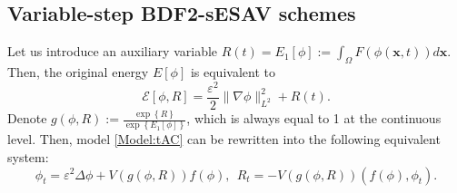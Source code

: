 \documentclass{m2an}
\begin{document}
\subsection{Variable-step BDF2-sESAV schemes}
Let us introduce an auxiliary variable $ R(t) = E_1[\phi] := \int_{\Omega}  F( \phi(\mathbf{x},t) )  d \mathbf{x}$. Then, the original energy $E[\phi]$ is equivalent to
$$
\mathcal{E}[\phi, R] = \frac{\varepsilon^2}{2}\|\nabla \phi\|_{L^2}^2 + R(t).
$$
Denote $g(\phi, R):=\frac{\exp \left\{R\right\}}{ \exp \left\{E_{1}[\phi]\right\} }$, which is always equal to 1 at the continuous level. Then, model \eqref{Model:tAC} can be rewritten into the following equivalent system:
\begin{equation}\label{sav_1}
	\phi_t  =\varepsilon^2 \Delta \phi + V( g( \phi, R ) ) f(\phi),~~
	R_t  = -V( g( \phi, R ) ) \left(f(\phi), \phi_t\right) .
\end{equation}
\end{document}
